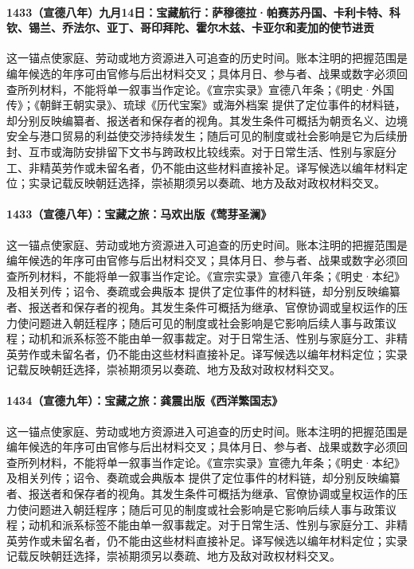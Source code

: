 \paragraph{1433（宣德八年）九月14日：宝藏航行：萨穆德拉·帕赛苏丹国、卡利卡特、科钦、锡兰、乔法尔、亚丁、哥印拜陀、霍尔木兹、卡亚尔和麦加的使节进贡} 这一锚点使家庭、劳动或地方资源进入可追查的历史时间。账本注明的把握范围是编年候选的年序可由官修与后出材料交叉；具体月日、参与者、战果或数字必须回查所列材料，不能将单一叙事当作定论。《宣宗实录》宣德八年条；《明史·外国传》；《朝鲜王朝实录》、琉球《历代宝案》或海外档案 提供了定位事件的材料链，却分别反映编纂者、报送者和保存者的视角。其发生条件可概括为朝贡名义、边境安全与港口贸易的利益使交涉持续发生；随后可见的制度或社会影响是它为后续册封、互市或海防安排留下文书与跨政权比较线索。对于日常生活、性别与家庭分工、非精英劳作或未留名者，仍不能由这些材料直接补足。译写候选以编年材料定位；实录记载反映朝廷选择，崇祯期须另以奏疏、地方及敌对政权材料交叉。

\paragraph{1433（宣德八年）：宝藏之旅：马欢出版《莺芽圣澜》} 这一锚点使家庭、劳动或地方资源进入可追查的历史时间。账本注明的把握范围是编年候选的年序可由官修与后出材料交叉；具体月日、参与者、战果或数字必须回查所列材料，不能将单一叙事当作定论。《宣宗实录》宣德八年条；《明史·本纪》及相关列传；诏令、奏疏或会典版本 提供了定位事件的材料链，却分别反映编纂者、报送者和保存者的视角。其发生条件可概括为继承、官僚协调或皇权运作的压力使问题进入朝廷程序；随后可见的制度或社会影响是它影响后续人事与政策议程；动机和派系标签不能由单一叙事裁定。对于日常生活、性别与家庭分工、非精英劳作或未留名者，仍不能由这些材料直接补足。译写候选以编年材料定位；实录记载反映朝廷选择，崇祯期须另以奏疏、地方及敌对政权材料交叉。

\paragraph{1434（宣德九年）：宝藏之旅：龚震出版《西洋繁国志》} 这一锚点使家庭、劳动或地方资源进入可追查的历史时间。账本注明的把握范围是编年候选的年序可由官修与后出材料交叉；具体月日、参与者、战果或数字必须回查所列材料，不能将单一叙事当作定论。《宣宗实录》宣德九年条；《明史·本纪》及相关列传；诏令、奏疏或会典版本 提供了定位事件的材料链，却分别反映编纂者、报送者和保存者的视角。其发生条件可概括为继承、官僚协调或皇权运作的压力使问题进入朝廷程序；随后可见的制度或社会影响是它影响后续人事与政策议程；动机和派系标签不能由单一叙事裁定。对于日常生活、性别与家庭分工、非精英劳作或未留名者，仍不能由这些材料直接补足。译写候选以编年材料定位；实录记载反映朝廷选择，崇祯期须另以奏疏、地方及敌对政权材料交叉。

